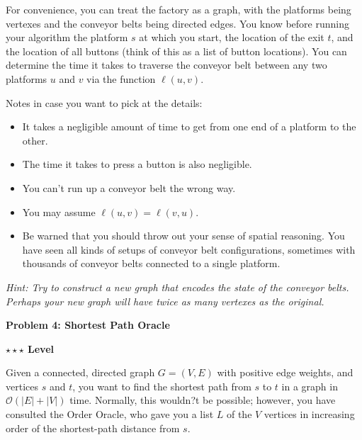 \documentclass{article}\usepackage[utf8]{inputenc}
\begin{document}
\vspace{3pt}
\noindent For convenience, you can treat the factory as a graph, with the platforms being vertexes and the conveyor belts being directed edges. You know before running your algorithm the platform $s$ at which you start, the location of the exit $t$, and the location of all buttons (think of this as a list of button locations). You can determine the time it takes to traverse the conveyor belt between any two platforms $u$ and $v$ via the function $\ell (u,v)$.

\vspace{3pt}
\noindent Notes in case you want to pick at the details:
\begin{itemize}
\item It takes a negligible amount of time to get from one end of a platform to the other.
\item The time it takes to press a button is also negligible.
\item You can't run up a conveyor belt the wrong way.
\item You may assume $\ell (u,v) = \ell (v,u)$.
\item Be warned that you should throw out your sense of spatial reasoning. You have seen all kinds of setups of conveyor belt configurations, sometimes with thousands of conveyor belts connected to a single platform.
\end{itemize}
\textit{Hint: Try to construct a new graph that encodes the state of the conveyor belts. Perhaps your new graph will have twice as many vertexes as the original.}
\\
\BeginSolution %

\EndSolution
\clearpage

\vspace{-2mm}\noindent\begin{mybox}{\begin{center}\textbf{\color{black}Problem 4: Shortest Path Oracle}\end{center}}\end{mybox}\vspace{-2mm}
\begin{myboxot}\noindent\textbf{$\star\star\star$ Level}\end{myboxot} 

\noindent Given a connected, directed graph $G=(V,E)$ with positive edge weights, and vertices $s$ and $t$, you want to find the shortest path from $s$ to $t$ in a graph in $\mathcal{O}(|E|+|V|)$ time. Normally, this wouldn?t be possible; however, you have consulted the Order Oracle, who gave you a list $L$ of the $V$ vertices in increasing order of the shortest-path distance from $s$.
\end{document}
